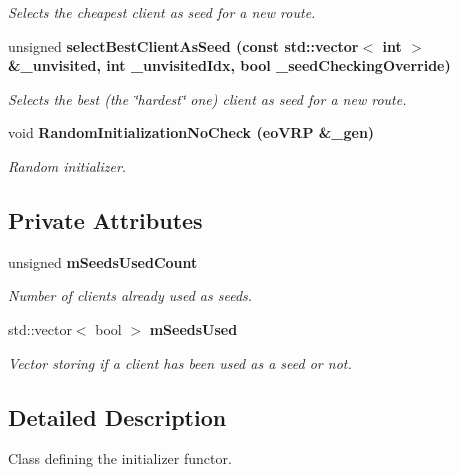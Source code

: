 \begin{CompactItemize}
\begin{CompactList}\small\item\em Selects the cheapest client as seed for a new route. \item\end{CompactList}\item 
unsigned \bf{select\-Best\-Client\-As\-Seed} (const std::vector$<$ int $>$ \&\_\-unvisited, int \_\-unvisited\-Idx, bool \_\-seed\-Checking\-Override)
\begin{CompactList}\small\item\em Selects the best (the \char`\"{}hardest\char`\"{} one) client as seed for a new route. \item\end{CompactList}\item 
void \bf{Random\-Initialization\-No\-Check} (\bf{eo\-VRP} \&\_\-gen)
\begin{CompactList}\small\item\em Random initializer. \item\end{CompactList}\end{CompactItemize}
\subsection*{Private Attributes}
\begin{CompactItemize}
\item 
unsigned \bf{m\-Seeds\-Used\-Count}\label{classeo_v_r_p_init_b74e164ca817fe5615e9519ec671a356}

\begin{CompactList}\small\item\em Number of clients already used as seeds. \item\end{CompactList}\item 
std::vector$<$ bool $>$ \bf{m\-Seeds\-Used}\label{classeo_v_r_p_init_5e940cc7eec88f268e8eb72313212947}

\begin{CompactList}\small\item\em Vector storing if a client has been used as a seed or not. \item\end{CompactList}\end{CompactItemize}


\subsection{Detailed Description}
Class defining the initializer functor. 

